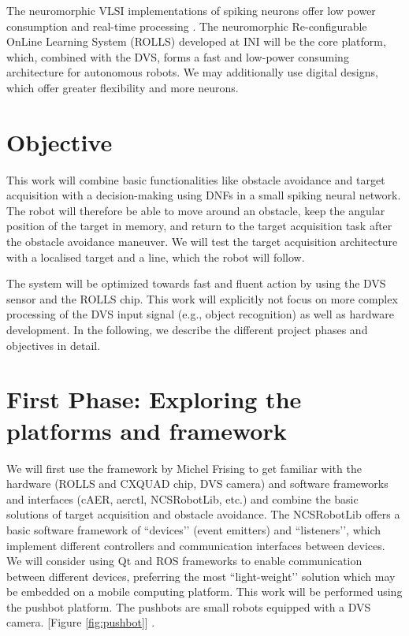 \documentclass[a4paper, twocolumn]{article}
\begin{document}
The neuromorphic VLSI implementations of spiking neurons offer low power consumption and real-time processing \cite{indiveri2011}. The neuromorphic Re-configurable OnLine Learning System (ROLLS) \cite{qiao2015} developed at INI will be the core platform, which, combined with the DVS, forms a fast and low-power consuming architecture for autonomous robots. We may additionally use digital designs, which offer greater flexibility and more neurons.

\newpage

\section*{Objective}
This work will combine basic functionalities like obstacle avoidance and target acquisition with a decision-making using DNFs in a small spiking neural network. The robot will therefore be able to move around an obstacle, keep the angular position of the target in memory, and  return to the target acquisition task after the obstacle avoidance maneuver. We will test the target acquisition architecture with a localised target and a line, which the robot will follow. 

The system will be optimized towards fast and fluent action by using the DVS sensor and the ROLLS chip. This work will explicitly not focus on more complex processing of the DVS input signal (e.g., object recognition) as well as hardware development.
In the following, we describe the different project phases and objectives in detail.

\section*{First Phase: Exploring the platforms and framework}
We will first use the framework by Michel Frising to get familiar with the hardware (ROLLS and CXQUAD chip, DVS camera) and software frameworks and interfaces (cAER, aerctl, NCSRobotLib, etc.) and combine the basic solutions of target acquisition and obstacle avoidance.
The NCSRobotLib offers  a basic software framework of ``devices’’ (event emitters) and ``listeners’’, which implement different controllers and communication interfaces between devices. We will consider using Qt and ROS frameworks to enable communication between different devices, preferring the most ``light-weight’’ solution which may be embedded on a mobile computing platform. This work will be performed using the pushbot platform. The pushbots are small robots equipped with a DVS camera. [Figure \ref{fig:pushbot}] \cite{pushbot}.
\end{document}
